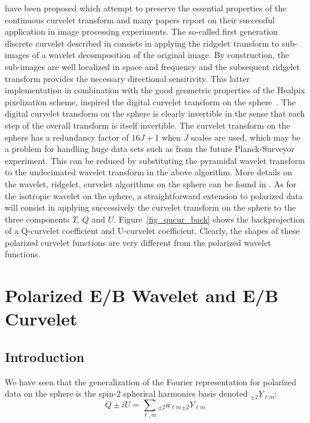 have been proposed which attempt to preserve the essential properties of the continuous curvelet transform and many papers \citep{starck:sta04,felix2008,starck:sta04} 
report on their successful application in image processing experiments. The so-called first generation discrete curvelet described in \citep{cur:donoho99,starck:sta01_3} 
consists in applying the ridgelet transform to sub-images of a wavelet decomposition of the original image. By construction, the sub-images are 
well localized in space and frequency and the subsequent ridgelet transform provides the necessary directional sensitivity. This latter implementation 
in combination with the good geometric properties of the Healpix pixelization scheme, inspired the digital curvelet transform on the sphere~\citep{starck:sta05_2}. 
The digital curvelet transform on the sphere is clearly invertible in the sense that each step of the overall transform is itself invertible. 
The curvelet transform on the sphere has a redundancy factor of $16J + 1$ when $J$ scales are used, which may be a problem for handling huge data sets 
such as from the future Planck-Surveyor experiment. This can be reduced by substituting the pyramidal wavelet transform to the undecimated wavelet 
transform in the above algorithm. More details on the wavelet, ridgelet, curvelet algorithms on the sphere can be found in \citep{starck:sta05_2}. 
As for the isotropic wavelet on the sphere, a straightforward extension to polarized data will consist in applying successively the curvelet transform 
on the sphere to the three components $T$, $Q$ and $U$. Figure~\ref{fig_qucur_back} shows the backprojection of a Q-curvelet coefficient and 
U-curvelet coefficient. Clearly, the shapes of these polarized curvelet functions are very different from the polarized wavelet functions.%
\section{Polarized E/B Wavelet and E/B Curvelet}
\label{sec:pol_eb}

\subsection{Introduction}
We have seen that the generalization of the Fourier representation for polarized data on the sphere is the spin-2 spherical harmonics basis denoted $_{\pm 2}Y_{\ell m}$: 
\begin{equation} 
Q \pm i U  = \sum_{\ell, m}  { _{\pm 2}a_{\ell m}}   {_{\pm 2}Y_{\ell m} }
\end{equation} 
  
